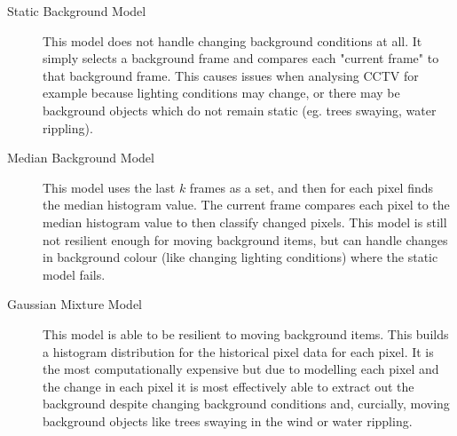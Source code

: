 \begin{description}
  \item[Static Background Model] This model does not handle changing background conditions at all. It simply selects a background frame and compares each "current frame" to that background frame. This causes issues when analysing CCTV for example because lighting conditions may change, or there may be background objects which do not remain static (eg. trees swaying, water rippling).
  \item[Median Background Model] This model uses the last $k$ frames as a set, and then for each pixel finds the median histogram value. The current frame compares each pixel to the median histogram value to then classify changed pixels. This model is still not resilient enough for moving background items, but can handle changes in background colour (like changing lighting conditions) where the static model fails.
  \item[Gaussian Mixture Model] This model is able to be resilient to moving background items. This builds a histogram distribution for the historical pixel data for each pixel. It is the most computationally expensive but due to modelling each pixel and the change in each pixel it is most effectively able to extract out the background despite changing background conditions and, curcially, moving background objects like trees swaying in the wind or water rippling.
\end{description}
